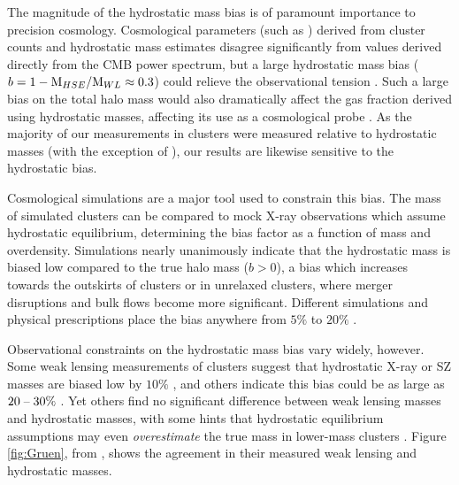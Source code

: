 The magnitude of the hydrostatic mass bias is of paramount importance
to precision cosmology. Cosmological parameters (such as \omegam{})
derived from \Planck{} cluster counts and hydrostatic mass estimates
disagree significantly from values derived directly from the CMB power
spectrum, but a large hydrostatic mass bias ($ b= 1-
\textrm{M}{}_{HSE}/\textrm{M}{}_{WL} \approx 0.3$) could relieve the
observational tension \citep{Gruen2013,VonderLinden2014,
  Israel2014}. Such a large bias on the total halo mass would also
dramatically affect the gas fraction derived using hydrostatic masses,
affecting its use as a cosmological probe
. As the majority of our \fg{}
measurements in clusters were measured relative to hydrostatic masses
(with the exception of \citet{Umetsu2009}), our results are likewise
sensitive to the hydrostatic bias.

Cosmological simulations are a major tool used to constrain this bias.
The mass of simulated clusters can be compared to mock X-ray
observations which assume hydrostatic equilibrium, determining the
bias factor as a function of mass and overdensity. Simulations nearly
unanimously indicate that the hydrostatic mass is biased low compared
to the true halo mass ($b>0$), a bias which increases towards the
outskirts of clusters or in unrelaxed clusters, where merger
disruptions and bulk flows become more significant. Different
simulations and physical prescriptions place the bias anywhere from
$5\%$  to $20\%$
.

Observational constraints on the hydrostatic mass bias vary widely,
however. Some weak lensing measurements of clusters suggest that
hydrostatic X-ray or SZ masses are biased low by $10\%$
\citep{Andersson2011,High2012}, and others indicate this bias could be
as large as $20\;\textrm{--}\;30\%$
\citep{Arnaud2007,Ichikawa2013,VonderLinden2014}. Yet others find no
significant difference between weak lensing masses and hydrostatic
masses, with some hints that hydrostatic equilibrium assumptions may
even \textit{overestimate} the true mass in lower-mass clusters
\citep{Gruen2013, Israel2014}. Figure \ref{fig:Gruen}, from
\citet{Gruen2013}, shows the agreement in their measured weak lensing
and hydrostatic masses.


\afterpage{\clearpage}

